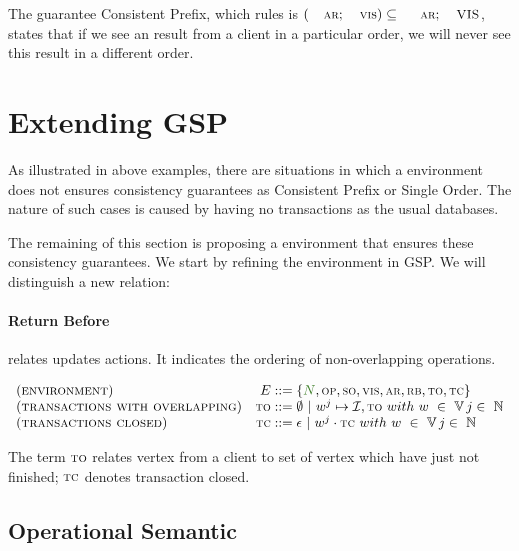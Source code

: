\documentclass[envcountsect,runningheads,orivec]{llncs}
\begin{document}
The guarantee Consistent Prefix, which rules is $(\textsc{\small{ar}};\textsc{\small{vis}}) \subseteq \ \textsc{\small{ar}};\textsc{\small{VIS}}$, states that if we see an result from a client in a particular order, we will never see this result in a different order.

\section{Extending GSP}
\label{sec:transactions}

As illustrated in above examples, there are situations in which a environment does not ensures consistency guarantees as Consistent Prefix or Single Order. The nature of such cases is caused by having no transactions as the usual databases.

The remaining of this section is proposing a environment that ensures these consistency guarantees. We start by refining the environment in GSP. We will distinguish a new relation:

\paragraph{Return Before} relates updates actions. It indicates the ordering of non-overlapping operations.

\[
    \begin{array}{l@{\quad}r@{\;::=\;}l}
			 (\textsc{environment}) & \environmentterm &  \environmenttran{\systemterm}{\op}{\so}{\vis}{\arb}{\rb}{\tx}{\tc} \\
			 (\textsc{transactions with overlapping}) & \tx &  \emptyset  \ | \ w^j \mapsto \idset,\tx  \  with \ w \ \in\ \verticesets\, j \in\ \mathbb{N} \\
			 (\textsc{transactions closed}) & \tc &  \epsilon  \ | \ w^j \cdot \tc \ with \ w \ \in\ \verticesets\, j \in\ \mathbb{N} 

	    \end{array}
\]


The term $\textsc{\scriptsize{TO}}$ relates vertex from a client to set of vertex which have just not finished; $\textsc{\scriptsize{TC}}$ denotes transaction closed.


\subsection{Operational Semantic}

\end{document}
